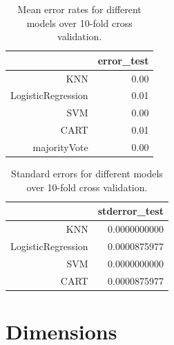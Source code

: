 \documentclass[a4paper,draft=false]{scrreprt}\usepackage[]{graphicx}\usepackage[]{color}
\begin{document}
\begin{table}[ht]
\centering
\begin{tabular}{rr}
  \hline
 & error\_test \\ 
  \hline
KNN & 0.00 \\ 
  LogisticRegression & 0.01 \\ 
  SVM & 0.00 \\ 
  CART & 0.01 \\ 
  majorityVote & 0.00 \\ 
   \hline
\end{tabular}
\caption{Mean error rates for different models over 10-fold cross validation.\label{table:meanerror}} 
\end{table}
\begin{table}[ht]
\centering
\begin{tabular}{rr}
  \hline
 & stderror\_test \\ 
  \hline
KNN & 0.0000000000 \\ 
  LogisticRegression & 0.0000875977 \\ 
  SVM & 0.0000000000 \\ 
  CART & 0.0000875977 \\ 
   \hline
\end{tabular}
\caption{Standard errors for different models over 10-fold cross validation.\label{table:stderror}} 
\end{table}


{\let\clearpage\relax \chapter{Dimensions}}

\appendix
\appendixpage
\end{document}
